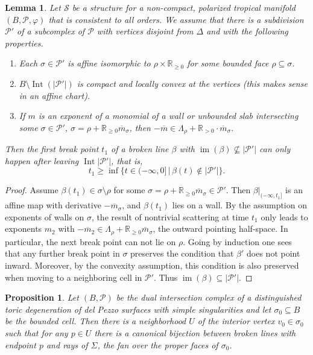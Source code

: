\documentclass[11pt,letter]{amsart}
\newtheorem{lemma}[theorem]{Lemma}
\newtheorem{proposition}[theorem]{Proposition}
\theoremstyle{definition}
\theoremstyle{remark}
\numberwithin{equation}{section}
\numberwithin{figure}{section}
\newcommand{\RR} {\mathbb{R}}
\newcommand {\im}  {\operatorname{im}}
\newcommand {\Int}  {\operatorname{Int}}
\renewcommand{\P}  {\mathscr{P}}
\newcommand {\scrS}  {\mathscr{S}}
\begin{document}
\begin{lemma}
\label{Lem: Broken lines are rays}
Let $\scrS$ be a structure for a non-compact, polarized tropical manifold
$(B,\P,\varphi)$ that is consistent to all orders. We assume that there is a
subdivision $\P'$ of a subcomplex of $\P$ with vertices disjoint from $\Delta$
and with the following properties.
\begin{enumerate}
\item
Each $\sigma\in \P'$ is affine isomorphic to $\rho\times\RR_{\ge0}$ for some
bounded face $\rho\subseteq \sigma$.
\item
$B\setminus \Int(|\P'|)$ is compact and locally convex at the vertices (this
makes sense in an affine chart).
\item
If $m$ is an exponent of a monomial of a wall or unbounded slab intersecting
some $\sigma\in\P'$, $\sigma=\rho+\RR_{\ge0}\overline m_{\sigma}$, then
$-\overline m\in\Lambda_\rho+\RR_{> 0}\cdot \overline m_{\sigma}$.
\end{enumerate}

Then the first break point $t_1$ of a broken line $\beta$ with
$\im(\beta)\not\subseteq |\P'|$ can only happen after leaving $\Int|\P'|$, that
is,
\[
t_1\ge \inf\big\{t\in (-\infty,0]\,\big|\, \beta(t)\not\in |\P'|\big\}.
\]
\end{lemma}

\begin{proof}
Assume $\beta(t_1)\in \sigma\setminus\rho$ for some $\sigma=
\rho+\RR_{\ge0}\overline m_{\sigma} \in\P'$. Then $\beta|_{(-\infty,t_1]}$ is an
affine map with derivative $-\overline m_{\sigma}$, and $\beta(t_1)$ lies on a
wall. By the assumption on exponents of walls on $\sigma$, the result of
nontrivial scattering at time $t_1$ only leads to exponents $m_2$ with
$-\overline m_2\in \Lambda_\rho+\RR_{\ge0} \overline m_{\sigma}$, the outward
pointing half-space. In particular, the next break point can not lie on $\rho$.
Going by induction one sees that any further break point in $\sigma$ preserves
the condition that $\beta'$ does not point inward. Moreover, by the convexity
assumption, this condition is also preserved when moving to a neighboring cell
in $\P'$. Thus $\im(\beta)\subseteq |\P'|$.
\end{proof}

\begin{proposition}
\label{Prop: Simple Hori-Vafa cases}
Let $(B,\P)$ be the dual intersection complex of a distinguished toric
degeneration of del Pezzo surfaces with simple singularities and let
$\sigma_0\subseteq B$ be the bounded cell. Then there is a neighborhood $U$ of
the interior vertex $v_0\in \sigma_0$ such that for any $p\in U$ there is a
canonical bijection between broken lines with endpoint $p$ and rays of $\Sigma$,
the fan over the proper faces of $\sigma_0$.
\end{proposition}
\end{document}
